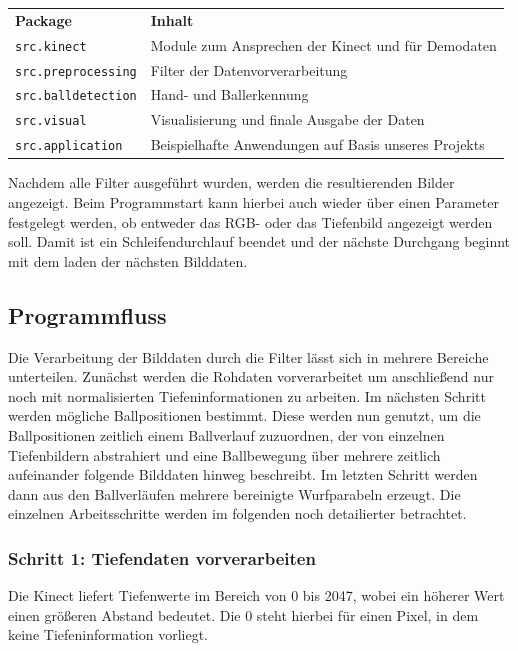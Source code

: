 \documentclass[12pt,a4paper,ngerman]{scrartcl}
\begin{document}
\begin{tabular}{ll}
\textbf{Package} & \textbf{Inhalt} \vspace{0.1cm} \\
{\lstinline!src.kinect!} & Module zum Ansprechen der Kinect und für Demodaten \\
{\lstinline!src.preprocessing!} & Filter der Datenvorverarbeitung\\
{\lstinline!src.balldetection!} & Hand- und Ballerkennung\\
{\lstinline!src.visual!} & Visualisierung und finale Ausgabe der Daten\\
{\lstinline!src.application!} & Beispielhafte Anwendungen auf Basis unseres Projekts
\end{tabular}

Nachdem alle Filter ausgeführt wurden, werden die resultierenden Bilder angezeigt. Beim Programmstart kann hierbei auch wieder über einen Parameter festgelegt werden, ob entweder das RGB- oder das Tiefenbild angezeigt werden soll. Damit ist ein Schleifendurchlauf beendet und der nächste Durchgang beginnt mit dem laden der nächsten Bilddaten.

\subsection{Programmfluss}

Die Verarbeitung der Bilddaten durch die Filter lässt sich in mehrere Bereiche unterteilen.
Zunächst werden die Rohdaten vorverarbeitet um anschließend nur noch mit normalisierten
Tiefeninformationen zu arbeiten. Im nächsten Schritt werden mögliche Ballpositionen bestimmt.
Diese werden nun genutzt, um die Ballpositionen zeitlich einem Ballverlauf zuzuordnen, der von einzelnen Tiefenbildern abstrahiert und eine Ballbewegung über mehrere zeitlich aufeinander folgende Bilddaten hinweg beschreibt.
Im letzten Schritt werden dann aus den Ballverläufen mehrere bereinigte Wurfparabeln erzeugt.
Die einzelnen Arbeitsschritte werden im folgenden noch detailierter betrachtet.

\subsubsection{Schritt 1: Tiefendaten vorverarbeiten}\label{sec:preprocess}

Die Kinect liefert Tiefenwerte im Bereich von 0 bis 2047, wobei ein höherer Wert
einen größeren Abstand bedeutet. Die 0 steht hierbei für einen Pixel, in dem keine
Tiefeninformation vorliegt.
\end{document}

